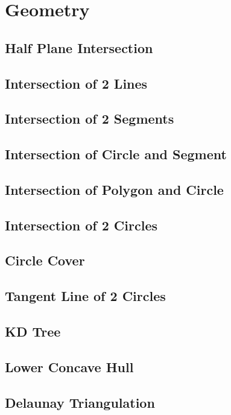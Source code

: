 \documentclass[a4paper,10pt,twocolumn,oneside]{article}
\begin{document}
\section{Geometry}
\subsection{Half Plane Intersection}
\subsection{Intersection of 2 Lines}

\subsection{Intersection of 2 Segments}

\subsection{Intersection of Circle and Segment}

\subsection{Intersection of Polygon and Circle}

\subsection{Intersection of 2 Circles}
\subsection{Circle Cover}

\subsection{Tangent Line of 2 Circles}

\subsection{KD Tree}

\subsection{Lower Concave Hull}

\subsection{Delaunay Triangulation}

\end{document}
